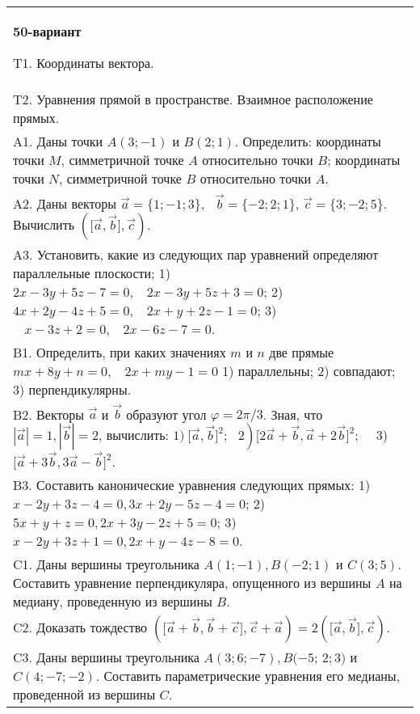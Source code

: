 \documentclass{article}
\begin{document}
\begin{tabular}{m{17cm}}
\textbf{50-вариант}
\newline

T1. 
Координаты вектора.
 \\
T2. 
Уравнения прямой в пространстве. Взаимное расположение прямых.
 \\
A1. 
Даны точки \(A(3; - 1)\) и \(B(2;1)\). Определить: координаты точки \(M\), симметричной точке \(A\) относительно точки \(B\); координаты точки \(N\), симметричной точке \(B\) относительно точки \(A\).
 \\
A2. 
Даны векторы \(\overrightarrow{a} = \{ 1; - 1;3\},\ \ \ \overrightarrow{b} = \{ - 2;2;1\}\), \(\overrightarrow{c} = \{ 3; - 2;5\}\). Вычислить \((\lbrack\overrightarrow{a},\overrightarrow{b}\rbrack,\overrightarrow{c})\).
 \\
A3. 
Установить, какие из следующих пар уравнений определяют параллельные плоскости; 1) \(2x - 3y + 5z - 7 = 0,\ \ \ \ 2x - 3y + 5z + 3 = 0\); 2) \(4x + 2y - 4z + 5 = 0,\ \ \ \ 2x + y + 2z - 1 = 0\); 3) \(\ \ \ \ x - 3z + 2 = 0,\ \ \ \ 2x - 6z - 7 = 0\).
 \\
B1. 
Определить, при каких значениях \(m\) и \(n\) две прямые \(mx + 8y + n = 0,\ \ \ \ 2x + my - 1 = 0\) 1) параллельны; 2) совпадают; 3) перпендикулярны.
 \\
B2. 
Векторы \(\overrightarrow{a}\) и \(\overrightarrow{b}\) образуют угол \(\varphi = 2\pi/3\). Зная, что \(|\overrightarrow{a}| = 1,|\overrightarrow{b}| = 2\), вычислить: \(1)\left. \ \lbrack\overrightarrow{a},\overrightarrow{b}\rbrack^{2};\ \ \ 2 \right)\lbrack 2\overrightarrow{a} + \overrightarrow{b},\overrightarrow{a} + 2\overrightarrow{b}\rbrack^{2};\ \ \ \ \) 3) \(\lbrack\overrightarrow{a} + 3\overrightarrow{b},3\overrightarrow{a} - \overrightarrow{b}\rbrack^{2}\).
 \\
B3. 
Составить канонические уравнения следующих прямых: 1) \(x - 2y + 3z - 4 = 0,3x + 2y - 5z - 4 = 0\); 2) \(5x + y + z = 0,2x + 3y - 2z + 5 = 0\); 3) \(x - 2y + 3z + 1 = 0,2x + y - 4z - 8 = 0\).
 \\
C1. 
Даны вершины треугольника \(A(1; - 1),B( - 2;1)\) и \(C(3;5)\). Составить уравнение перпендикуляра, опущенного из вершины \(A\) на медиану, проведенную из вершины \(B\).
 \\
C2. 
Доказать тождество \((\lbrack\overrightarrow{a} + \overrightarrow{b},\overrightarrow{b} + \overrightarrow{c}\rbrack,\overrightarrow{c} + \overrightarrow{a}) = 2(\lbrack\overrightarrow{a},\overrightarrow{b}\rbrack,\overrightarrow{c})\).
 \\
C3. 
Даны вершины треугольника \(A(3;6; - 7),B( - 5\); \(2;3)\) и \(C(4; - 7; - 2)\). Составить параметрические уравнения его медианы, проведенной из вершины \(C\).
 \\

\end{tabular}
\vspace{1cm}
\end{document}
